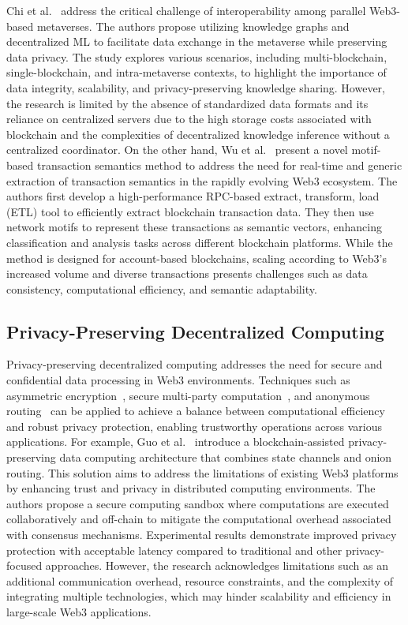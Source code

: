 \documentclass[5p,twocolumn]{elsarticle}
\begin{document}
Chi et al.~\cite{chi2023networking} address the critical challenge of interoperability among parallel Web3-based metaverses. The authors propose utilizing knowledge graphs and decentralized ML to facilitate data exchange in the metaverse while preserving data privacy. The study explores various scenarios, including multi-blockchain, single-blockchain, and intra-metaverse contexts, to highlight the importance of data integrity, scalability, and privacy-preserving knowledge sharing. However, the research is limited by the absence of standardized data formats and its reliance on centralized servers due to the high storage costs associated with blockchain and the complexities of decentralized knowledge inference without a centralized coordinator. On the other hand, Wu et al.~\cite{wu2023know} present a novel motif-based transaction semantics method to address the need for real-time and generic extraction of transaction semantics in the rapidly evolving Web3 ecosystem. The authors first develop a high-performance RPC-based extract, transform, load (ETL) tool to efficiently extract blockchain transaction data. They then use network motifs to represent these transactions as semantic vectors, enhancing classification and analysis tasks across different blockchain platforms. While the method is designed for account-based blockchains, scaling according to Web3's increased volume and diverse transactions presents challenges such as data consistency, computational efficiency, and semantic adaptability.

\subsection{Privacy-Preserving Decentralized Computing}
Privacy-preserving decentralized computing addresses the need for secure and confidential data processing in Web3 environments. Techniques such as asymmetric encryption~\cite{simmons1979symmetric}, secure multi-party computation~\cite{du2001secure}, and anonymous routing~\cite{shirazi2018survey} can be applied to achieve a balance between computational efficiency and robust privacy protection, enabling trustworthy operations across various applications. For example, Guo et al.~\cite{guo2023blockchain} introduce a blockchain-assisted privacy-preserving data computing architecture that combines state channels and onion routing. This solution aims to address the limitations of existing Web3 platforms by enhancing trust and privacy in distributed computing environments. The authors propose a secure computing sandbox where computations are executed collaboratively and off-chain to mitigate the computational overhead associated with consensus mechanisms. Experimental results demonstrate improved privacy protection with acceptable latency compared to traditional and other privacy-focused approaches. However, the research acknowledges limitations such as an additional communication overhead, resource constraints, and the complexity of integrating multiple technologies, which may hinder scalability and efficiency in large-scale Web3 applications.
\end{document}
